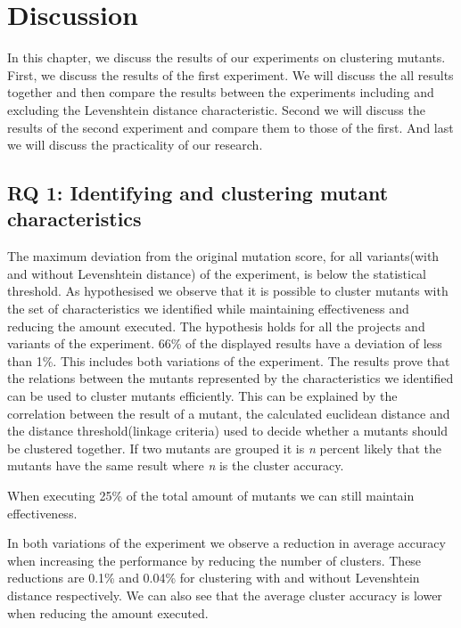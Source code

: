 \documentclass[../main]{subfiles}
\begin{document}
\chapter{Discussion}
\label{ch:discussion}
In this chapter, we discuss the results of our experiments on clustering mutants.
First, we discuss the results of the first experiment. 
We will discuss the all results together and then compare the results between the experiments including and excluding the Levenshtein distance characteristic.
Second we will discuss the results of the second experiment and compare them to those of the first.
And last we will discuss the practicality of our research.

\section{RQ 1: Identifying and clustering mutant characteristics}
The maximum deviation from the original mutation score, for all variants(with and without Levenshtein distance) of the experiment, is below the statistical threshold.
As hypothesised we observe that it is possible to cluster mutants with the set of characteristics we identified while maintaining effectiveness and reducing the amount executed.
The hypothesis holds for all the projects and variants of the experiment.
66\% of the displayed results have a deviation of less than 1\%. 
This includes both variations of the experiment.
\newline
The results prove that the relations between the mutants represented by the characteristics we identified can be used to cluster mutants efficiently. 
This can be explained by the correlation between the result of a mutant, the calculated euclidean distance and the distance threshold(linkage criteria) used to decide whether a mutants should be clustered together.
\newline
If two mutants are grouped it is \textit{n} percent likely that the mutants have the same result where \textit{n} is the cluster accuracy.
\begin{finding}
    When executing 25\% of the total amount of mutants we can still maintain effectiveness.
\end{finding}
In both variations of the experiment we observe a reduction in average accuracy when increasing the performance by reducing the number of clusters.
These reductions are 0.1\% and 0.04\% for clustering with and without Levenshtein distance respectively.
We can also see that the average cluster accuracy is lower when reducing the amount executed.
\end{document}

